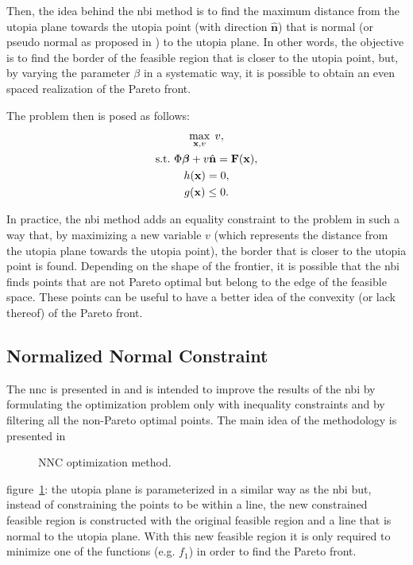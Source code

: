 Then, the idea behind the \gls{nbi} method is to find the maximum distance from the utopia plane towards the utopia point (with direction $\hat{\mathbf{n}}$) that is normal (or pseudo normal as proposed in \cite{Das1998}) to the utopia plane. In other words, the objective is to find the border of the feasible region that is closer to the utopia point, but, by varying the parameter $\beta$ in a systematic way, it is possible to obtain an even spaced realization of the Pareto front. 

The problem then is posed as follows:%
%
\begin{equation}
\begin{gathered}
\max_{\mathbf{x},v}{\;v}, \\
\text{s.t.} \ \Phi \boldsymbol{\beta} + v \hat{\mathbf{n}} = \mathbf{F}(\mathbf{x}),\\
h(\mathbf{x})=0, \\
g(\mathbf{x}) \leq 0.
\end{gathered}
\label{eq:NBIProblem}
\end{equation}%

In practice, the \gls{nbi} method adds an equality constraint to the problem in such a way that, by maximizing a new variable $v$ (which represents the distance from the utopia plane towards the utopia point), the border that is closer to the utopia point is found. Depending on the shape of the frontier, it is possible that the \gls{nbi} finds points that are not Pareto optimal but belong to the edge of the feasible space. These points can be useful to have a better idea of the convexity (or lack thereof) of the Pareto front.
\subsection{Normalized Normal Constraint}
\label{sec:NNC}
The \gls{nnc} is presented in \cite{Messac2003} and is intended to improve the results of the \gls{nbi} by formulating the optimization problem only with inequality constraints and by filtering all the non-Pareto optimal points. The main idea of the methodology is presented in
%
\begin{figure}%
	\centering
	\caption{NNC optimization method.}%
	\label{fig:NNC}%
\end{figure}
%
figure~\ref{fig:NNC}: the utopia plane is parameterized in a similar way as the \gls{nbi} but, instead of constraining the points to be within a line, the new constrained feasible region is constructed with the original feasible region and a line that is normal to the utopia plane. With this new feasible region it is only required to minimize one of the functions (e.g. $f_{1}$) in order to find the Pareto front.

